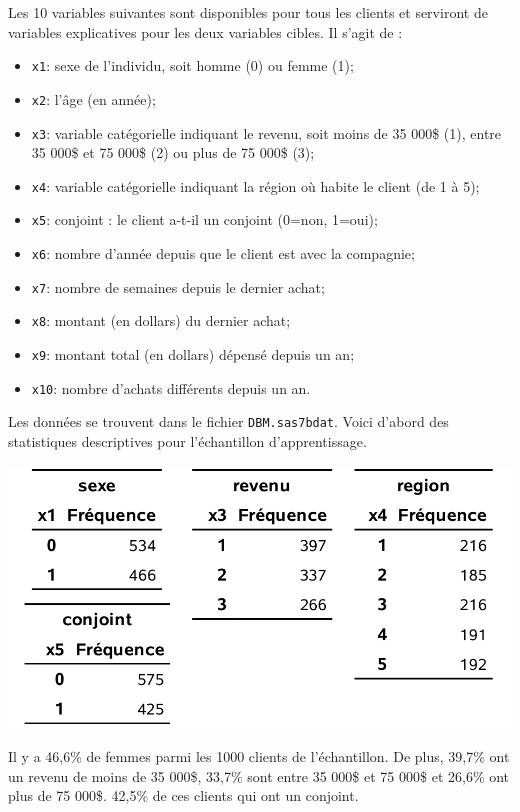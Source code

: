 \documentclass[
  11pt,
  letterpaper,
]{book}
\providecommand{\tightlist}{%
  \setlength{\itemsep}{0pt}\setlength{\parskip}{0pt}}
\theoremstyle{definition}
\theoremstyle{definition}
\theoremstyle{definition}
\theoremstyle{remark}
\begin{document}
Les 10 variables suivantes sont disponibles pour tous les clients et serviront de variables explicatives pour les deux variables cibles. Il s'agit de :

\begin{itemize}
\tightlist
\item
  \texttt{x1}: sexe de l'individu, soit homme (0) ou femme (1);
\item
  \texttt{x2}: l'âge (en année);
\item
  \texttt{x3}: variable catégorielle indiquant le revenu, soit moins de 35 000\$ (1), entre 35 000\$ et 75 000\$ (2) ou plus de 75 000\$ (3);
\item
  \texttt{x4}: variable catégorielle indiquant la région où habite le client (de 1 à 5);
\item
  \texttt{x5}: conjoint : le client a-t-il un conjoint (0=non, 1=oui);
\item
  \texttt{x6}: nombre d'année depuis que le client est avec la compagnie;
\item
  \texttt{x7}: nombre de semaines depuis le dernier achat;
\item
  \texttt{x8}: montant (en dollars) du dernier achat;
\item
  \texttt{x9}: montant total (en dollars) dépensé depuis un an;
\item
  \texttt{x10}: nombre d'achats différents depuis un an.
\end{itemize}

Les données se trouvent dans le fichier \texttt{DBM.sas7bdat}. Voici d'abord des statistiques descriptives pour l'échantillon d'apprentissage.

\begin{center}\includegraphics[width=0.6\linewidth]{figures/02-select-e3} \end{center}

Il y a 46,6\% de femmes parmi les 1000 clients de l'échantillon. De plus, 39,7\% ont un revenu de moins de 35 000\$, 33,7\% sont entre 35 000\$ et 75 000\$ et 26,6\% ont plus de 75 000\$. 42,5\% de ces clients qui ont un conjoint.
\end{document}
